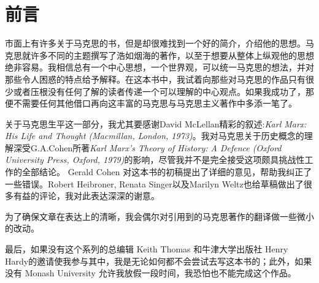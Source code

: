\chapter{前言}
市面上有许多关于马克思的书，但是却很难找到一个好的简介，介绍他的思想。马克思就许多不同的主题撰写了浩如烟海的著作，以至于想要从整体上纵观他的思想绝非容易。我相信总有一个中心思想，一个世界观，可以统一马克思的想法，并对那些令人困惑的特点给予解释。在这本书中，我试着向那些对马克思的作品只有很少或者压根没有任何了解的读者传递一个可以理解的中心观点。如果我成功了，那便不需要任何其他借口再向这丰富的马克思与马克思主义著作中多添一笔了。

关于马克思生平这一部分，我尤其要感谢David McLellan精彩的叙述:\textit{Karl Marx: His Life and Thought (Macmillan, London, 1973)}。我对马克思关于历史概念的理解深受G.A.Cohen所著\textit{Karl Marx’s Theory of History: A Defence (Oxford University Press, Oxford, 1979)}的影响，尽管我并不是完全接受这项颇具挑战性工作的全部结论。 Gerald Cohen 对这本书的初稿提出了详细的意见，帮助我纠正了一些错误。Robert Heibroner, Renata Singer以及Marilyn Weltz也给草稿做出了很多有益的评论，我对此表达深深的谢意。

为了确保文章在表达上的清晰，我会偶尔对引用到的马克思著作的翻译做一些微小的改动。

最后，如果没有这个系列的总编辑 Keith Thomas 和牛津大学出版社 Henry Hardy的邀请使我参与其中，我是无论如何都不会尝试去写这本书的；此外，如果没有 Monash University 允许我放假一段时间，我恐怕也不能完成这个作品。



